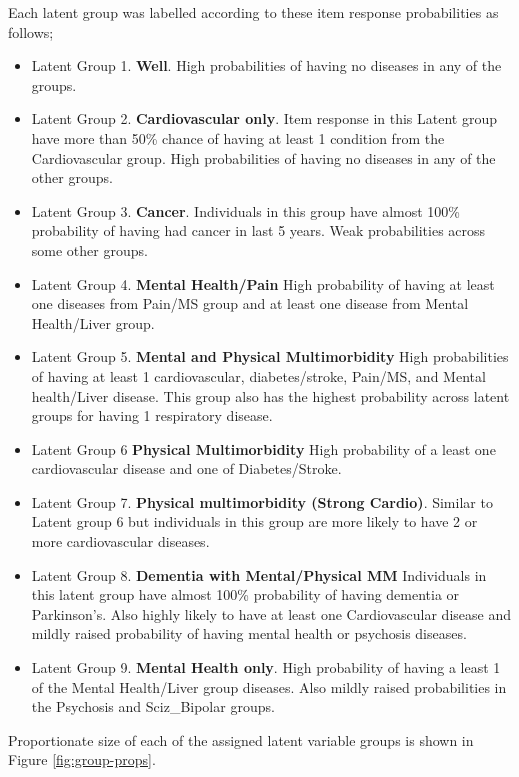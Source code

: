 \documentclass[12pt,]{report}
\providecommand{\tightlist}{%
  \setlength{\itemsep}{0pt}\setlength{\parskip}{0pt}}
\begin{document}
Each latent group was labelled according to these item response
probabilities as follows;

\begin{itemize}
\tightlist
\item
  Latent Group 1. \textbf{Well}. High probabilities of having no
  diseases in any of the groups.
\item
  Latent Group 2. \textbf{Cardiovascular only}. Item response in this
  Latent group have more than 50\% chance of having at least 1 condition
  from the Cardiovascular group. High probabilities of having no
  diseases in any of the other groups.
\item
  Latent Group 3. \textbf{Cancer}. Individuals in this group have almost
  100\% probability of having had cancer in last 5 years. Weak
  probabilities across some other groups.
\item
  Latent Group 4. \textbf{Mental Health/Pain} High probability of having
  at least one diseases from Pain/MS group and at least one disease from
  Mental Health/Liver group.
\item
  Latent Group 5. \textbf{Mental and Physical Multimorbidity} High
  probabilities of having at least 1 cardiovascular, diabetes/stroke,
  Pain/MS, and Mental health/Liver disease. This group also has the
  highest probability across latent groups for having 1 respiratory
  disease.
\item
  Latent Group 6 \textbf{Physical Multimorbidity} High probability of a
  least one cardiovascular disease and one of Diabetes/Stroke.
\item
  Latent Group 7. \textbf{Physical multimorbidity (Strong Cardio)}.
  Similar to Latent group 6 but individuals in this group are more
  likely to have 2 or more cardiovascular diseases.
\item
  Latent Group 8. \textbf{Dementia with Mental/Physical MM} Individuals
  in this latent group have almost 100\% probability of having dementia
  or Parkinson's. Also highly likely to have at least one Cardiovascular
  disease and mildly raised probability of having mental health or
  psychosis diseases.
\item
  Latent Group 9. \textbf{Mental Health only}. High probability of
  having a least 1 of the Mental Health/Liver group diseases. Also
  mildly raised probabilities in the Psychosis and Sciz\_Bipolar groups.
\end{itemize}

Proportionate size of each of the assigned latent variable groups is
shown in Figure \ref{fig:group-props}.
\end{document}
